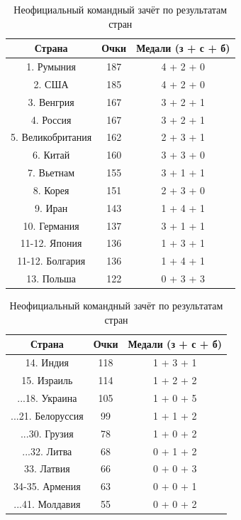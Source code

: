 \documentclass[a4paper,9pt]{article}
\begin{document}
\begin{table}[h!]
\caption{Неофициальный командный зачёт по результатам стран}
\centering
\begin{tabular}{|c|c|c|}
\hline
\textbf{Страна}        & \textbf{Очки} & \textbf{Медали (з + с + б)} \\ \hline
1. Румыния             & 187           & 4 + 2 + 0                   \\ \hline
2. США                 & 185           & 4 + 2 + 0                   \\ \hline
3. Венгрия             & 167           & 3 + 2 + 1                   \\ \hline
4. Россия              & 167           & 3 + 2 + 1                   \\ \hline
5. Великобритания      & 162           & 2 + 3 + 1                   \\ \hline
6. Китай               & 160           & 3 + 3 + 0                   \\ \hline
7. Вьетнам             & 155           & 3 + 1 + 1                   \\ \hline
8. Корея               & 151           & 2 + 3 + 0                   \\ \hline
9. Иран                & 143           & 1 + 4 + 1                   \\ \hline
10. Германия           & 137           & 3 + 1 + 1                   \\ \hline
11-12. Япония          & 136           & 1 + 3 + 1                   \\ \hline
11-12. Болгария        & 136           & 1 + 4 + 1                   \\ \hline
13. Польша             & 122           & 0 + 3 + 3                   \\ \hline
\end{tabular}
\quad
\begin{tabular}{c|c|c}
\hline
\textbf{Страна}        & \textbf{Очки} & \textbf{Медали (з + с + б)} \\ \hline
14. Индия              & 118           & 1 + 3 + 1                   \\ \hline
15. Израиль            & 114           & 1 + 2 + 2                   \\ \hline
...18. Украина         & 105           & 1 + 0 + 5                   \\ \hline
...21. Белоруссия       & 99           & 1 + 1 + 2                   \\ \hline
...30. Грузия           & 78           & 1 + 0 + 2                   \\ \hline
...32. Литва            & 68           & 0 + 1 + 2                   \\ \hline
33. Латвия              & 66           & 0 + 0 + 3                   \\ \hline
34-35. Армения          & 63           & 0 + 0 + 1                   \\ \hline
...41. Молдавия         & 55           & 0 + 0 + 2                   \\ \hline
\end{tabular}
\end{table}
\end{document}
